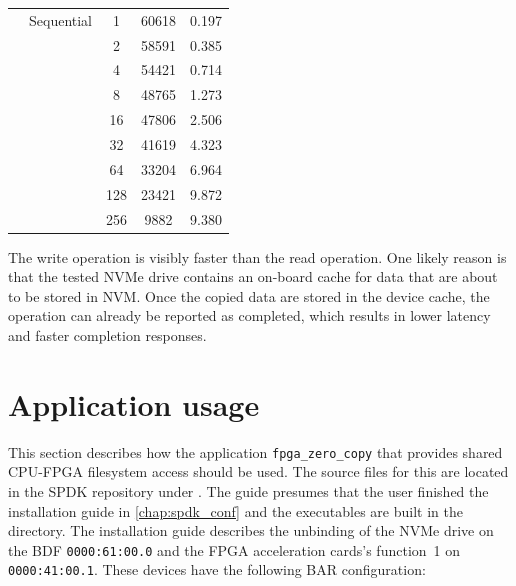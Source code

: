 \begin{table}[!ht]
\begin{tabular}{llSSS}
        \addlinespace
         & Sequential & 1 & 60618 & 0.197 \\
         &  & 2 & 58591 & 0.385 \\
         &  & 4 & 54421 & 0.714 \\
         &  & 8 & 48765 & 1.273 \\
         &  & 16 & 47806 & 2.506 \\
         &  & 32 & 41619 & 4.323 \\
         &  & 64 & 33204 & 6.964 \\
         &  & 128 & 23421 & 9.872 \\
         &  & 256 & 9882 & 9.380 \\
        \bottomrule
    \end{tabular}
\end{table}

The write operation is visibly faster than the read operation. One likely reason is that the tested
NVMe drive contains an on-board cache for data that are about to be stored in \ac{NVM}. Once the
copied data are stored in the device cache, the operation can already be reported as completed,
which results in lower latency and faster completion responses.

\section{Application usage}
\label{sect:app_usage}

This section describes how the application \verb|fpga_zero_copy| that provides shared CPU-FPGA
filesystem access should be used. The source files for this are located in the SPDK repository under
. The guide presumes that the user finished the installation guide
in \cref{chap:spdk_conf} and the executables are built in the  directory. The
installation guide describes the unbinding of the NVMe drive on the \ac{BDF} \verb|0000:61:00.0| and
the FPGA acceleration cards's function~1 on \verb|0000:41:00.1|. These devices have the following
\ac{BAR} configuration:

